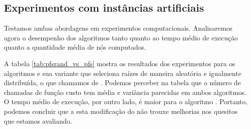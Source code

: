 \subsection{Experimentos com instâncias artificiais}
\label{pfs:root_choosing:experiments}
Testamos ambas abordagens em experimentos computacionais. Analisaremos agora o desempenho dos 
algoritmos tanto quanto ao tempo médio de execução quanto a quantidade
média de nós computados.

A tabela \ref{tab:pfsrand_vs_pfs} mostra os resultados dos 
experimentos para os algoritmos  e sua variante que 
seleciona raízes de maneira aleatória e igualmente distribuída, o que 
chamamos de . Podemos perceber na tabela que o número
de chamadas de função custo tem média e variância parecidas em ambos 
algoritmos. O tempo médio de execução, por outro lado, é maior para o
algoritmo . Portanto, podemos concluir que a
esta modificação do  não trouxe melhorias nos quesitos
que estamos avaliando.

